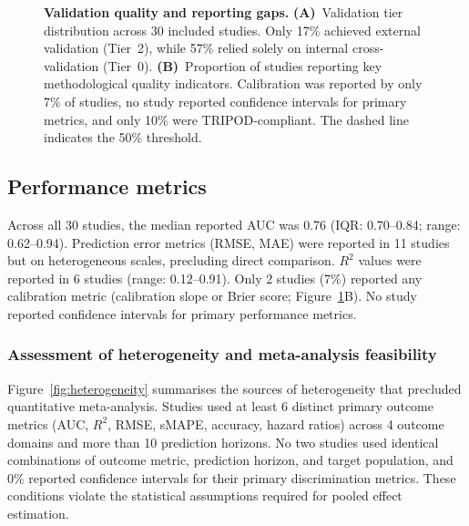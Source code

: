 \documentclass[11pt,a4paper]{article}
\begin{document}
\begin{figure}[H]
\caption{\textbf{Validation quality and reporting gaps.} \textbf{(A)}~Validation tier distribution across 30 included studies. Only 17\% achieved external validation (Tier~2), while 57\% relied solely on internal cross-validation (Tier~0). \textbf{(B)}~Proportion of studies reporting key methodological quality indicators. Calibration was reported by only 7\% of studies, no study reported confidence intervals for primary metrics, and only 10\% were TRIPOD-compliant. The dashed line indicates the 50\% threshold.}
\label{fig:validation}
\end{figure}

\subsection{Performance metrics}

Across all 30 studies, the median reported AUC was 0.76 (IQR: 0.70--0.84; range: 0.62--0.94). Prediction error metrics (RMSE, MAE) were reported in 11 studies but on heterogeneous scales, precluding direct comparison. $R^2$ values were reported in 6 studies (range: 0.12--0.91). Only 2 studies (7\%) reported any calibration metric (calibration slope or Brier score; Figure~\ref{fig:validation}B). No study reported confidence intervals for primary performance metrics.

\subsubsection{Assessment of heterogeneity and meta-analysis feasibility}

Figure~\ref{fig:heterogeneity} summarises the sources of heterogeneity that precluded quantitative meta-analysis. Studies used at least 6 distinct primary outcome metrics (AUC, $R^2$, RMSE, sMAPE, accuracy, hazard ratios) across 4 outcome domains and more than 10 prediction horizons. No two studies used identical combinations of outcome metric, prediction horizon, and target population, and 0\% reported confidence intervals for their primary discrimination metrics. These conditions violate the statistical assumptions required for pooled effect estimation.
\end{document}
